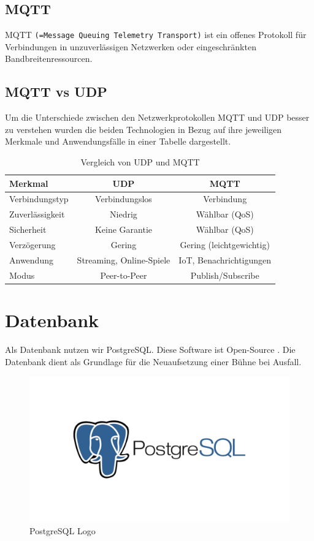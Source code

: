 \subsection{MQTT}
MQTT \texttt{(=Message Queuing Telemetry Transport)} ist ein offenes Protokoll für Verbindungen in unzuverlässigen Netzwerken oder eingeschränkten Bandbreitenressourcen. \parencite{MQTT}

\newpage
\subsection{MQTT vs UDP}
Um die Unterschiede zwischen den Netzwerkprotokollen MQTT und UDP besser zu verstehen wurden die beiden Technologien in Bezug auf ihre jeweiligen Merkmale und Anwendungsfälle in einer Tabelle dargestellt. 

\begin{table}[H]
	\centering
	\begin{tabular}{|l|c|c|}
		\hline
		\textbf{Merkmal} & \textbf{UDP} & \textbf{MQTT} \\
		\hline
		Verbindungstyp & Verbindungslos & Verbindung \\
		\hline
		Zuverlässigkeit & Niedrig & Wählbar (QoS) \\
		\hline
		Sicherheit & Keine Garantie & Wählbar (QoS) \\
		\hline
		Verzögerung & Gering & Gering (leichtgewichtig) \\
		\hline
		Anwendung & Streaming, Online-Spiele & IoT, Benachrichtigungen \\
		\hline
		Modus & Peer-to-Peer & Publish/Subscribe \\
		\hline
	\end{tabular}
	\caption{Vergleich von UDP und MQTT}
	\label{tab:udp_mqtt}
	\textcite{MQTTvsUDP}
\end{table}

\newpage
\section{Datenbank}
Als Datenbank nutzen wir PostgreSQL. Diese Software ist Open-Source \parencite{PostgreSQL}. Die Datenbank dient als Grundlage für die Neuaufsetzung einer Bühne bei Ausfall.

\begin{figure}[H]
	\centering
	\includegraphics[width=0.5\linewidth]{images/postgres-logo.png}
	\caption[PostgreSQL Logo]{PostgreSQL Logo}
	\label{fig:PostgreSQLLogo}
\end{figure}

